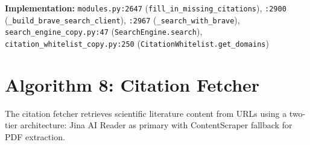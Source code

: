 \noindent\textbf{Implementation:} \texttt{modules.py:2647} (\texttt{fill\_in\_missing\_citations}), \texttt{:2900} (\texttt{\_build\_brave\_search\_client}), \texttt{:2967} (\texttt{\_search\_with\_brave}),\\
\texttt{search\_engine\_copy.py:47} (\texttt{SearchEngine.search}), \texttt{citation\_whitelist\_copy.py:250} (\texttt{CitationWhitelist.get\_domains})

\section{Algorithm 8: Citation Fetcher}
\label{alg:citation_fetcher}

The citation fetcher retrieves scientific literature content from URLs using a two-tier architecture: Jina AI Reader as primary with ContentScraper fallback for PDF extraction.

